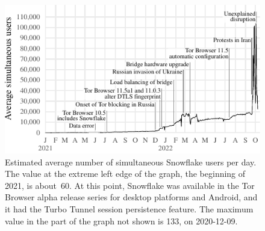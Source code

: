 \documentclass[letterpaper,twocolumn]{article}
\begin{document}
\begin{figure}
\includegraphics{figures/users-global/users-global}
\caption{
Estimated average number of simultaneous Snowflake users per day.
The value at the extreme left edge of the graph,
the beginning of 2021, is about~60.
At this point, Snowflake was available in the Tor Browser alpha release series
for desktop platforms and Android,
and it had the Turbo Tunnel session persistence feature.
The maximum value in the part of the graph not shown
is 133, on \mbox{2020-12-09}.
}
\label{fig:user-counts}
\end{figure}
\end{document}
